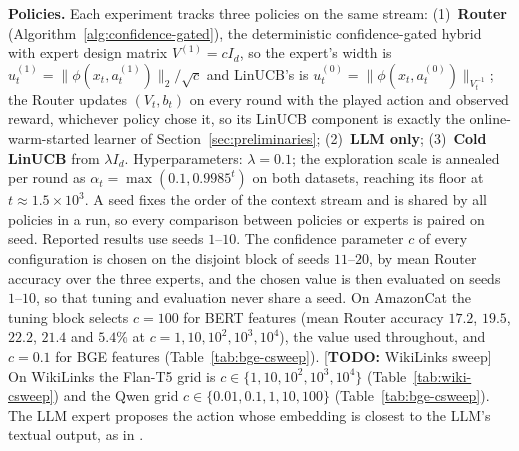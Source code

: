 \documentclass{article}
\theoremstyle{definition}
\theoremstyle{remark}
\theoremstyle{remark}
\newcommand{\todo}[1]{\textcolor{red!70!black}{[\textbf{TODO:} #1]}}
\begin{document}
\textbf{Policies.} Each experiment tracks three policies on the same stream:
(1)~\textbf{Router} (Algorithm~\ref{alg:confidence-gated}), the deterministic
confidence-gated hybrid with expert design matrix $V^{(1)}=cI_d$, so the
expert's width is $u_t^{(1)}=\|\phi(x_t,a_t^{(1)})\|_2/\sqrt c$ and LinUCB's is
$u_t^{(0)}=\|\phi(x_t,a_t^{(0)})\|_{V_t^{-1}}$; the Router updates $(V_t,b_t)$ on
every round with the played action and observed reward, whichever policy
chose it, so its LinUCB component is exactly the online-warm-started learner
of Section~\ref{sec:preliminaries}; (2)~\textbf{LLM only}; (3)~\textbf{Cold
LinUCB} from $\lambda I_d$. Hyperparameters: $\lambda=0.1$; the exploration
scale is annealed per round as $\alpha_t=\max(0.1,0.9985^t)$ on both datasets,
reaching its floor at $t\approx1.5\times10^3$. A seed fixes the order of the
context stream and is shared by all policies in a run, so every comparison
between policies or experts is paired on seed. Reported results use
seeds $1$--$10$. The confidence parameter $c$ of every configuration is chosen
on the disjoint block of seeds $11$--$20$, by mean Router accuracy over the
three experts, and the chosen value is then evaluated on seeds $1$--$10$, so
that tuning and evaluation never share a seed. On AmazonCat the tuning block
selects $c=100$ for BERT features (mean Router accuracy $17.2$, $19.5$,
$22.2$, $21.4$ and $5.4\%$ at $c=1,10,10^2,10^3,10^4$), the value used
throughout, and $c=0.1$ for BGE features (Table~\ref{tab:bge-csweep}).
\todo{WikiLinks sweep} On WikiLinks the Flan-T5 grid is
$c\in\{1,10,10^2,10^3,10^4\}$ (Table~\ref{tab:wiki-csweep}) and the Qwen grid
$c\in\{0.01,0.1,1,10,100\}$ (Table~\ref{tab:bge-csweep}).
The LLM expert proposes the action whose embedding is closest to the LLM's
textual output, as in \cite{chen2024llmdecision}.
\end{document}
